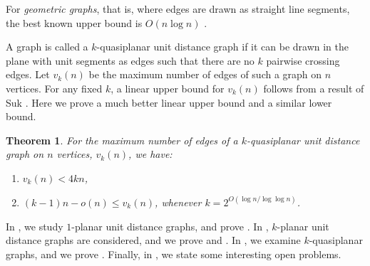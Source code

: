 \documentclass[a4paper,10pt]{article}
\newtheorem{theorem}{Theorem}
\begin{document}
For {\em geometric graphs}, that is, where edges are drawn as straight line segments, the best known upper bound is $O(n\log n)$ \cite{V98}.

A graph is called a $k$-quasiplanar unit distance graph if it can be drawn in the plane with unit segments as edges such that there are no $k$ pairwise crossing edges. Let $v_k(n)$ be the maximum number of edges of such a graph on $n$ vertices. 
For any fixed $k$, a linear upper bound for $v_k(n)$ follows from a result of Suk \cite{S14}. 
Here we prove a much better linear upper bound and a similar lower bound. 

\begin{theorem}\label{quasi}
For the maximum number of edges of a $k$-quasiplanar unit distance graph on $n$ vertices, $v_k(n)$, we have:

\begin{enumerate}[label=(\roman*)] 
\item $v_k(n)< 4kn$,
\item $(k-1)n-o(n)\le v_k(n)$,
whenever $k=2^{O\left(\log n/\log\log n \right)}$.
\end{enumerate}
\end{theorem} 


\smallskip


In , we study $1$-planar unit distance graphs, and 
prove . In , $k$-planar unit distance graphs are considered, and we prove  and . In , we examine $k$-quasiplanar graphs, and we prove . Finally, in , we state some interesting open problems.



\end{document}
